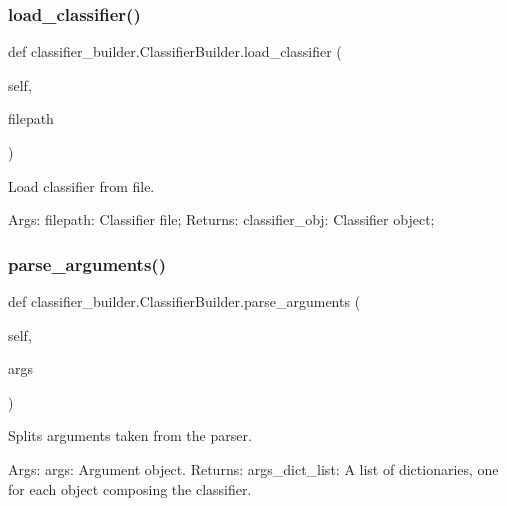 \subsubsection{\texorpdfstring{load\+\_\+classifier()}{load\_classifier()}}
{\footnotesize\ttfamily def classifier\+\_\+builder.\+Classifier\+Builder.\+load\+\_\+classifier (\begin{DoxyParamCaption}\item[{}]{self,  }\item[{}]{filepath }\end{DoxyParamCaption})}



Load classifier from file. 

Args\+: filepath\+: Classifier file; Returns\+: classifier\+\_\+obj\+: Classifier object; \mbox{\label{classclassifier__builder_1_1_classifier_builder_aa98a1ccc17d5be35f9b9a8762f19714b}} 
\subsubsection{\texorpdfstring{parse\+\_\+arguments()}{parse\_arguments()}}
{\footnotesize\ttfamily def classifier\+\_\+builder.\+Classifier\+Builder.\+parse\+\_\+arguments (\begin{DoxyParamCaption}\item[{}]{self,  }\item[{}]{args }\end{DoxyParamCaption})}



Splits arguments taken from the parser. 

Args\+: args\+: Argument object. Returns\+: args\+\_\+dict\+\_\+list\+: A list of dictionaries, one for each object composing the classifier. \mbox{\label{classclassifier__builder_1_1_classifier_builder_a3a7bc9a4619d927546fc82464767cd8a}} 
